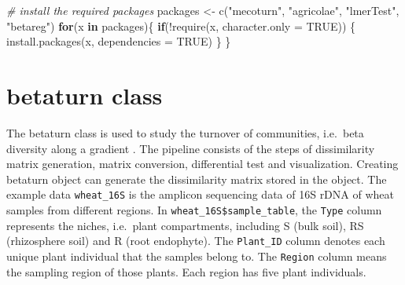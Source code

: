\documentclass[
]{book}
\newenvironment{Shaded}{\begin{snugshade}}{\end{snugshade}}
\newcommand{\AttributeTok}[1]{\textcolor[rgb]{0.77,0.63,0.00}{#1}}
\newcommand{\CommentTok}[1]{\textcolor[rgb]{0.56,0.35,0.01}{\textit{#1}}}
\newcommand{\ConstantTok}[1]{\textcolor[rgb]{0.00,0.00,0.00}{#1}}
\newcommand{\ControlFlowTok}[1]{\textcolor[rgb]{0.13,0.29,0.53}{\textbf{#1}}}
\newcommand{\FunctionTok}[1]{\textcolor[rgb]{0.00,0.00,0.00}{#1}}
\newcommand{\NormalTok}[1]{#1}
\newcommand{\OtherTok}[1]{\textcolor[rgb]{0.56,0.35,0.01}{#1}}
\newcommand{\SpecialCharTok}[1]{\textcolor[rgb]{0.00,0.00,0.00}{#1}}
\newcommand{\StringTok}[1]{\textcolor[rgb]{0.31,0.60,0.02}{#1}}
\begin{document}
\begin{Shaded}
\begin{Highlighting}[]
\CommentTok{\# install the required packages}
\NormalTok{packages }\OtherTok{\textless{}{-}} \FunctionTok{c}\NormalTok{(}\StringTok{"mecoturn"}\NormalTok{, }\StringTok{"agricolae"}\NormalTok{, }\StringTok{"lmerTest"}\NormalTok{, }\StringTok{"betareg"}\NormalTok{)}
\ControlFlowTok{for}\NormalTok{(x }\ControlFlowTok{in}\NormalTok{ packages)\{}
    \ControlFlowTok{if}\NormalTok{(}\SpecialCharTok{!}\FunctionTok{require}\NormalTok{(x, }\AttributeTok{character.only =} \ConstantTok{TRUE}\NormalTok{)) \{}
        \FunctionTok{install.packages}\NormalTok{(x, }\AttributeTok{dependencies =} \ConstantTok{TRUE}\NormalTok{)}
\NormalTok{    \}}
\NormalTok{\}}
\end{Highlighting}
\end{Shaded}

\hypertarget{betaturn-class}{%
\section{betaturn class}\label{betaturn-class}}

The betaturn class is used to study the turnover of communities, i.e.~beta diversity along a gradient \citep{Anderson_Navigating_2011}.
The pipeline consists of the steps of dissimilarity matrix generation, matrix conversion, differential test and visualization.
Creating betaturn object can generate the dissimilarity matrix stored in the object.
The example data \texttt{wheat\_16S} is the amplicon sequencing data of 16S rDNA of wheat samples from different regions.
In \texttt{wheat\_16S\$sample\_table}, the \texttt{Type} column represents the niches, i.e.~plant compartments, including S (bulk soil), RS (rhizosphere soil) and R (root endophyte).
The \texttt{Plant\_ID} column denotes each unique plant individual that the samples belong to.
The \texttt{Region} column means the sampling region of those plants. Each region has five plant individuals.

\begin{Shaded}
\end{Shaded}
\end{document}
